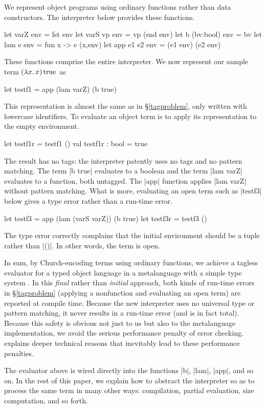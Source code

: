 \documentclass[preprint]{sigplanconf}
\newcommand{\fun}[1]{\mathopen{\lambda\mathord{#1}.\,}}
\newcommand{\True}{\mathinner{\mathrm{true}}}
\begin{document}
We represent object programs using ordinary functions rather than
data constructors.  The interpreter below provides these functions.
\begin{code}
let varZ env        = fst env
let varS vp env     = vp (snd env)
let b (bv:bool) env = bv
let lam e env       = fun x -> e (x,env)
let app e1 e2 env   = (e1 env) (e2 env)
\end{code}
These functions comprise the entire interpreter.
We now represent our sample term $(\fun{x}x)\True$ as
\begin{code}
let testf1 = app (lam varZ) (b true)
\end{code}
This representation is almost the same as in \S\ref{tagproblem}, only
written with lowercase identifiers. To evaluate an object term is to
apply its representation to the empty environment.
\begin{code}
let testf1r = testf1 ()
val testf1r : bool = true
\end{code}
The result has no tags: the interpreter patently uses no tags and no
pattern matching. The term |b true| evaluates to a boolean and the term
|lam varZ| evaluates to a function, both untagged. The |app| function
applies |lam varZ| without pattern matching. What is more, evaluating an
open term such as |testf3| below gives a type error rather than
a run-time error.
\begin{code}
let testf3 = app (lam (varS varZ)) (b true)
let testf3r = testf3 ()
\end{code}
The type error correctly complains
that the initial environment should be a tuple rather than |()|.
In other words, the term is open.

In sum, by Church\hyp encoding terms using ordinary functions,
we achieve a tagless evaluator
for a typed object language in a metalanguage with a simple type
system \citep{hindley-principal,milner-theory}.  In this \emph{final}
rather than \emph{initial} approach, both kinds of run-time errors
in \S\ref{tagproblem} (applying a nonfunction and evaluating an open
term) are reported at compile time. 
Because the new interpreter uses no
universal type or
pattern matching, it never results in a run-time error (and is in fact
total).  Because this safety is obvious not just to us but also to the
metalanguage implementation, we avoid the serious performance penalty
\citep{WalidICFP02} of error checking.  
explains deeper technical reasons that inevitably lead to these performance
penalties.

The evaluator above is wired directly into the
functions |b|, |lam|, |app|, and so on.  In the rest of this paper, 
we explain how to abstract the interpreter so as
to process the same term in many other
ways: compilation, partial evaluation, size
computation, and so forth.
\end{document}
